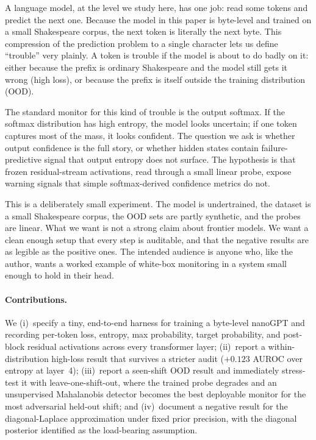\documentclass[11pt]{article}
\begin{document}
A language model, at the level we study here, has one job: read some tokens and predict the next one. Because the model in this paper is byte-level and trained on a small Shakespeare corpus, the next token is literally the next byte. This compression of the prediction problem to a single character lets us define ``trouble'' very plainly. A token is trouble if the model is about to do badly on it: either because the prefix is ordinary Shakespeare and the model still gets it wrong (high loss), or because the prefix is itself outside the training distribution (OOD).

The standard monitor for this kind of trouble is the output softmax. If the softmax distribution has high entropy, the model looks uncertain; if one token captures most of the mass, it looks confident. The question we ask is whether output confidence is the full story, or whether hidden states contain failure-predictive signal that output entropy does not surface. The hypothesis is that frozen residual-stream activations, read through a small linear probe, expose warning signals that simple softmax-derived confidence metrics do not.

This is a deliberately small experiment. The model is undertrained, the dataset is a small Shakespeare corpus, the OOD sets are partly synthetic, and the probes are linear. What we want is not a strong claim about frontier models. We want a clean enough setup that every step is auditable, and that the negative results are as legible as the positive ones. The intended audience is anyone who, like the author, wants a worked example of white-box monitoring in a system small enough to hold in their head.

\paragraph{Contributions.} We (i)~specify a tiny, end-to-end harness for training a byte-level nanoGPT and recording per-token loss, entropy, max probability, target probability, and post-block residual activations across every transformer layer; (ii)~report a within-distribution high-loss result that survives a stricter audit ($+0.123$ AUROC over entropy at layer~4); (iii)~report a seen-shift OOD result and immediately stress-test it with leave-one-shift-out, where the trained probe degrades and an unsupervised Mahalanobis detector becomes the best deployable monitor for the most adversarial held-out shift; and (iv)~document a negative result for the diagonal-Laplace approximation under fixed prior precision, with the diagonal posterior identified as the load-bearing assumption.
\end{document}
